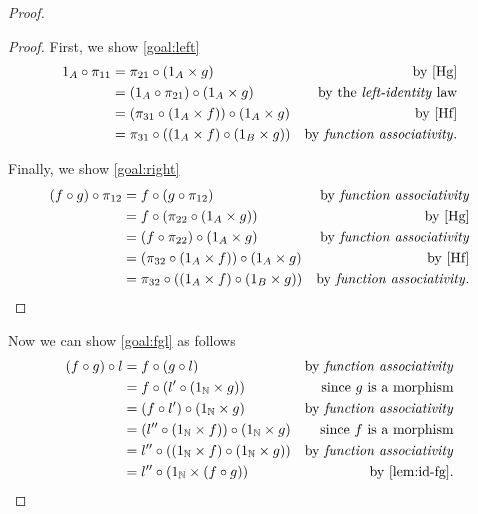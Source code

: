 \begin{solution}
\begin{proof}
\begin{proof}
				First, we show \eqref{goal:left}
				\begin{align*}
					1_A \circ \pi_{11} & = \pi_{21} \circ (1_A \times g)                          & \text{by \eqref{Hg}}                      \\
					                   & = ( 1_A \circ \pi_{21} ) \circ (1_A \times g)            & \text{by the \textit{left-identity} law}  \\
					                   & = ( \pi_{31} \circ (1_A \times f) ) \circ (1_A \times g) & \text{by \eqref{Hf}}                      \\
					                   & = \pi_{31} \circ ((1_A \times f) \circ (1_B \times g))   & \text{by \textit{function associativity}}
					.
				\end{align*}

				Finally, we show \eqref{goal:right}
				\begin{align*}
					(f \circ g) \circ \pi_{12} & = f \circ (g \circ \pi_{12})                           & \text{by \textit{function associativity}}  \\
					                           & = f \circ (\pi_{22} \circ (1_A \times g))              & \text{by \eqref{Hg}}                       \\
					                           & = (f \circ \pi_{22}) \circ (1_A \times g)              & \text{by \textit{function associativity}}  \\
					                           & = (\pi_{32} \circ (1_A \times f)) \circ (1_A \times g) & \text{by \eqref{Hf}}                       \\
					                           & = \pi_{32} \circ ((1_A \times f) \circ (1_B \times g)) & \text{by \textit{function associativity}}.
				\end{align*}
			\end{proof}

			Now we can show \eqref{goal:fgl} as follows
			\begin{align*}
				(f \circ g) \circ l & = f \circ (g \circ l)                                               & \text{by \textit{function associativity}} \\
				                    & = f \circ (l' \circ (1_\NN \times g))                        & \text{since $g$ is a morphism}            \\
				                    & = (f \circ l') \circ (1_\NN \times g)                        & \text{by \textit{function associativity}} \\
				                    & = (l'' \circ (1_\NN \times f)) \circ (1_\NN \times g) & \text{since $f$ is a morphism}            \\
				                    & = l'' \circ ((1_\NN \times f) \circ (1_\NN \times g)) & \text{by \textit{function associativity}} \\
				                    & = l'' \circ (1_\NN \times (f \circ g))                       & \text{by \cref{lem:id-fg}}.
			\end{align*}
		\end{proof}


\end{solution}

